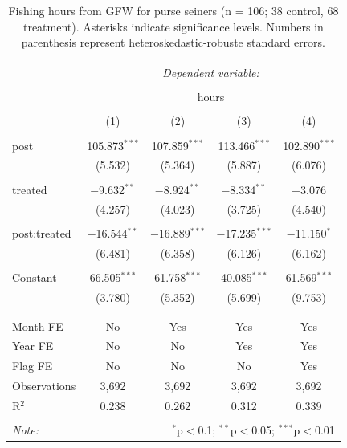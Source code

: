 \documentclass[]{article}
\begin{document}
\begin{table}[!htbp] \centering 
  \caption{\label{tab:purse}Fishing hours from GFW for purse seiners (n = 106; 38 control, 68 treatment). Asterisks indicate significance levels. Numbers in parenthesis represent heteroskedastic-robuste standard errors.} 
  \label{} 
\begin{tabular}{@{\extracolsep{5pt}}lcccc} 
\\[-1.8ex]\hline 
\hline \\[-1.8ex] 
 & \multicolumn{4}{c}{\textit{Dependent variable:}} \\ 
\cline{2-5} 
\\[-1.8ex] & \multicolumn{4}{c}{hours} \\ 
\\[-1.8ex] & (1) & (2) & (3) & (4)\\ 
\hline \\[-1.8ex] 
 post & 105.873$^{***}$ & 107.859$^{***}$ & 113.466$^{***}$ & 102.890$^{***}$ \\ 
  & (5.532) & (5.364) & (5.887) & (6.076) \\ 
  & & & & \\ 
 treated & $-$9.632$^{**}$ & $-$8.924$^{**}$ & $-$8.334$^{**}$ & $-$3.076 \\ 
  & (4.257) & (4.023) & (3.725) & (4.540) \\ 
  & & & & \\ 
 post:treated & $-$16.544$^{**}$ & $-$16.889$^{***}$ & $-$17.235$^{***}$ & $-$11.150$^{*}$ \\ 
  & (6.481) & (6.358) & (6.126) & (6.162) \\ 
  & & & & \\ 
 Constant & 66.505$^{***}$ & 61.758$^{***}$ & 40.085$^{***}$ & 61.569$^{***}$ \\ 
  & (3.780) & (5.352) & (5.699) & (9.753) \\ 
  & & & & \\ 
\hline \\[-1.8ex] 
Month FE & No & Yes & Yes & Yes \\ 
Year FE & No & No & Yes & Yes \\ 
Flag FE & No & No & No & Yes \\ 
Observations & 3,692 & 3,692 & 3,692 & 3,692 \\ 
R$^{2}$ & 0.238 & 0.262 & 0.312 & 0.339 \\ 
\hline 
\hline \\[-1.8ex] 
\textit{Note:}  & \multicolumn{4}{r}{$^{*}$p$<$0.1; $^{**}$p$<$0.05; $^{***}$p$<$0.01} \\ 
\end{tabular} 
\end{table}
\end{document}
